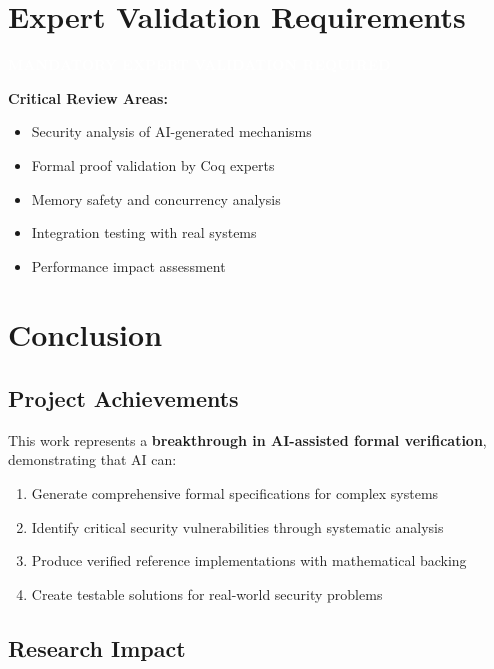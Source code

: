\documentclass[11pt,a4paper]{article}
\begin{document}
\section{Expert Validation Requirements}

\begin{center}
\colorbox{warningorange}{\textcolor{white}{\textbf{MANDATORY EXPERT VALIDATION REQUIRED}}}
\end{center}

\vspace{0.5cm}

\textbf{Critical Review Areas:}
\begin{itemize}
    \item Security analysis of AI-generated mechanisms
    \item Formal proof validation by Coq experts  
    \item Memory safety and concurrency analysis
    \item Integration testing with real systems
    \item Performance impact assessment
\end{itemize}

\section{Conclusion}

\subsection{Project Achievements}

This work represents a \textbf{breakthrough in AI-assisted formal verification}, demonstrating that AI can:

\begin{enumerate}
    \item Generate comprehensive formal specifications for complex systems
    \item Identify critical security vulnerabilities through systematic analysis
    \item Produce verified reference implementations with mathematical backing
    \item Create testable solutions for real-world security problems
\end{enumerate}

\subsection{Research Impact}
\end{document}
